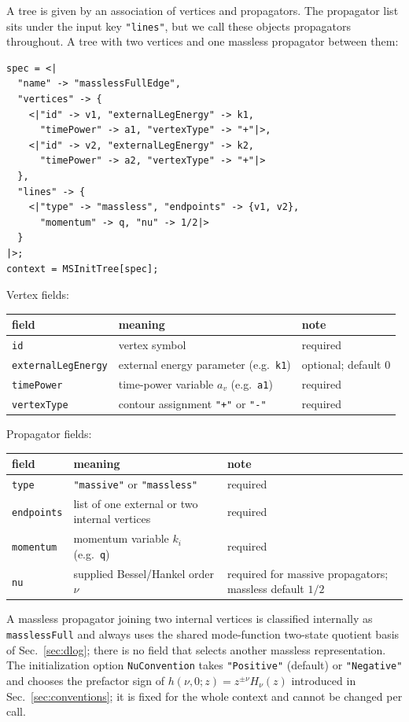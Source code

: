 \documentclass[11pt,a4paper]{article}
\begin{document}
A tree is given by an association of vertices and propagators. The propagator list sits under
the input key \texttt{"lines"}, but we call these objects propagators throughout. A tree with two vertices and one massless propagator between them:
\begin{verbatim}
spec = <|
  "name" -> "masslessFullEdge",
  "vertices" -> {
    <|"id" -> v1, "externalLegEnergy" -> k1,
      "timePower" -> a1, "vertexType" -> "+"|>,
    <|"id" -> v2, "externalLegEnergy" -> k2,
      "timePower" -> a2, "vertexType" -> "+"|>
  },
  "lines" -> {
    <|"type" -> "massless", "endpoints" -> {v1, v2},
      "momentum" -> q, "nu" -> 1/2|>
  }
|>;
context = MSInitTree[spec];
\end{verbatim}
Vertex fields:
\begin{center}
\begin{tabular}{@{}lp{5.5cm}p{3.8cm}@{}}
\toprule
field & meaning & note\\
\midrule
\texttt{id} & vertex symbol & required\\
\texttt{externalLegEnergy} & external energy parameter (e.g.\ \texttt{k1}) & optional; default $0$\\
\texttt{timePower} & time-power variable $a_v$ (e.g.\ \texttt{a1}) & required\\
\texttt{vertexType} & contour assignment \texttt{"+"} or \texttt{"-"} & required\\
\bottomrule
\end{tabular}
\end{center}
Propagator fields:
\begin{center}
\begin{tabular}{@{}p{4.4cm}p{5.3cm}p{3.8cm}@{}}
\toprule
field & meaning & note\\
\midrule
\texttt{type} & \texttt{"massive"} or \texttt{"massless"} & required\\
\texttt{endpoints} & list of one external or two internal vertices & required\\
\texttt{momentum} & momentum variable $k_i$ (e.g.\ \texttt{q}) & required\\
\texttt{nu} & supplied Bessel/Hankel order $\nu$ & required for massive propagators; massless default $1/2$\\
\bottomrule
\end{tabular}
\end{center}
A massless propagator joining two internal vertices is classified internally as \texttt{masslessFull} and
always uses the shared mode-function two-state quotient basis of Sec.~\ref{sec:dlog}; there is no field that
selects another massless representation.
The initialization option \texttt{NuConvention} takes \texttt{"Positive"} (default) or
\texttt{"Negative"} and chooses the prefactor sign of $h(\nu,0;z)=z^{\pm\nu}H_\nu(z)$ introduced in
Sec.~\ref{sec:conventions}; it is fixed for the whole context and cannot be changed per call.
\end{document}
